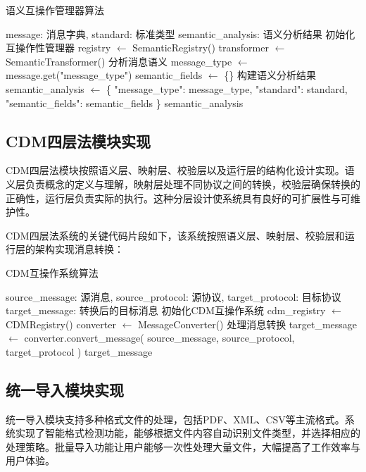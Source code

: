 \begin{algorithm}[H]
\caption{语义互操作管理器算法}
\begin{algorithmic}[1]
\REQUIRE message: 消息字典, standard: 标准类型
\ENSURE semantic\_analysis: 语义分析结果
\STATE 初始化互操作性管理器
\STATE registry $\leftarrow$ SemanticRegistry()
\STATE transformer $\leftarrow$ SemanticTransformer()
\STATE 分析消息语义
\STATE message\_type $\leftarrow$ message.get("message\_type")
\STATE semantic\_fields $\leftarrow$ \{\}
\STATE 构建语义分析结果
\STATE semantic\_analysis $\leftarrow$ \{
\STATE     "message\_type": message\_type,
\STATE     "standard": standard,
\STATE     "semantic\_fields": semantic\_fields
\STATE \}
\RETURN semantic\_analysis
\end{algorithmic}
\end{algorithm}

\subsection{CDM四层法模块实现}

CDM四层法模块按照语义层、映射层、校验层以及运行层的结构化设计实现。语义层负责概念的定义与理解，映射层处理不同协议之间的转换，校验层确保转换的正确性，运行层负责实际的执行。这种分层设计使系统具有良好的可扩展性与可维护性。

CDM四层法系统的关键代码片段如下，该系统按照语义层、映射层、校验层和运行层的架构实现消息转换：

\begin{algorithm}[H]
\caption{CDM互操作系统算法}
\begin{algorithmic}[1]
\REQUIRE source\_message: 源消息, source\_protocol: 源协议, target\_protocol: 目标协议
\ENSURE target\_message: 转换后的目标消息
\STATE 初始化CDM互操作系统
\STATE cdm\_registry $\leftarrow$ CDMRegistry()
\STATE converter $\leftarrow$ MessageConverter()
\STATE 处理消息转换
\STATE target\_message $\leftarrow$ converter.convert\_message(
\STATE     source\_message, source\_protocol, target\_protocol
\STATE )
\RETURN target\_message
\end{algorithmic}
\end{algorithm}

\subsection{统一导入模块实现}

统一导入模块支持多种格式文件的处理，包括PDF、XML、CSV等主流格式。系统实现了智能格式检测功能，能够根据文件内容自动识别文件类型，并选择相应的处理策略。批量导入功能让用户能够一次性处理大量文件，大幅提高了工作效率与用户体验。

